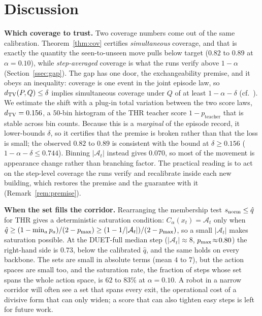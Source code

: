 \section{Discussion}
\label{sec:disc}
\textbf{Which coverage to trust.}
Two coverage numbers come out of the same calibration.
Theorem~\ref{thm:cov} certifies
\emph{simultaneous} coverage, and that is exactly the quantity the
seen-to-unseen move pulls below target ($0.82$ to $0.89$ at $\alpha=0.10$),
while \emph{step-averaged} coverage is what the runs verify above $1-\alpha$
(Section~\ref{ssec:gap}). The gap has one door, the exchangeability
premise, and it obeys an inequality: coverage is one event in the joint
episode law, so $d_{\mathrm{TV}}(P,Q)\leq\delta$ implies simultaneous coverage under
$Q$ of at least $1-\alpha-\delta$ (cf.~\cite{barber2023beyond}). We
estimate the shift with a plug-in total
variation between the two score laws, $d_{\mathrm{TV}} = 0.156$, a $50$-bin histogram
of the THR teacher score $1-p_{\mathrm{teacher}}$ that is stable across bin
counts. Because this is a \emph{marginal} of the episode
record, it lower-bounds $\delta$, so it certifies that the premise is broken
rather than that the loss is small; the observed $0.82$ to $0.89$ is
consistent with the bound at $\delta \geq 0.156$
($1-\alpha-\delta \leq 0.744$). Binning $|\mathcal{A}_t|$ instead gives
$0.070$, so most of the movement is appearance change rather than branching
factor. The practical reading is to act on the step-level coverage the runs
verify and recalibrate inside each new building, which restores the premise
and the guarantee with it (Remark~\ref{rem:premise}).

\textbf{When the set fills the corridor.}
Rearranging the membership test $s_{\mathrm{norm}}\leq\hat q$ for THR gives a
deterministic saturation condition: $C_\alpha(x_t)=\mathcal{A}_t$ only when
$\hat q\geq(1-\min_a p_a)/(2-p_{\max})\geq(1-1/|\mathcal{A}_t|)/(2-p_{\max})$, so a
small $|\mathcal{A}_t|$ makes saturation possible. At the DUET-full median
step ($|\mathcal{A}_t|\!\approx\!8$, $p_{\max}\!\approx\!0.80$) the right-hand
side is $0.73$, below the calibrated $\hat q$, and the same holds on every
backbone. The sets are small in absolute terms (mean $4$ to $7$), but the
action spaces are small too, and the saturation rate, the fraction of steps
whose set spans the whole action space, is $62$ to $83\%$ at $\alpha = 0.10$.
A robot in a narrow corridor will often see a set that spans every exit, the
operational cost of a divisive form that can only widen; a score that can also
tighten easy steps is left for future work.


